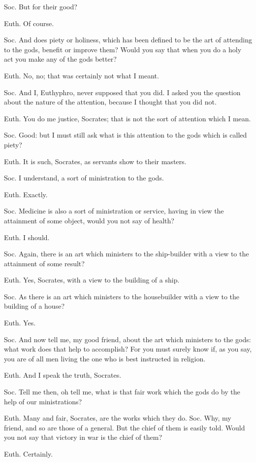 Soc. But for their good?

Euth. Of course.

Soc. And does piety or holiness, which has been defined to be the art of attending to the gods, benefit or improve them? Would you say that when you do a holy act you make any of the gods better?

Euth. No, no; that was certainly not what I meant.

Soc. And I, Euthyphro, never supposed that you did. I asked you the question about the nature of the attention, because I thought that you did not.

Euth. You do me justice, Socrates; that is not the sort of attention which I mean.

Soc. Good: but I must still ask what is this attention to the gods which is called piety?

Euth. It is such, Socrates, as servants show to their masters.

Soc. I understand, a sort of ministration to the gods.

Euth. Exactly.

Soc. Medicine is also a sort of ministration or service, having in view the attainment of some object, would you not say of health?

Euth. I should.

Soc. Again, there is an art which ministers to the ship-builder with a view to the attainment of some result?

Euth. Yes, Socrates, with a view to the building of a ship.

Soc. As there is an art which ministers to the housebuilder with a view to the building of a house?

Euth. Yes.

Soc. And now tell me, my good friend, about the art which ministers to the gods: what work does that help to accomplish? For you must surely know if, as you say, you are of all men living the one who is best instructed in religion.

Euth. And I speak the truth, Socrates.

Soc. Tell me then, oh tell me, what is that fair work which the gods do by the help of our ministrations?

Euth. Many and fair, Socrates, are the works which they do. Soc. Why, my friend, and so are those of a general. But the chief of them is easily told. Would you not say that victory in war is the chief of them?

Euth. Certainly.

